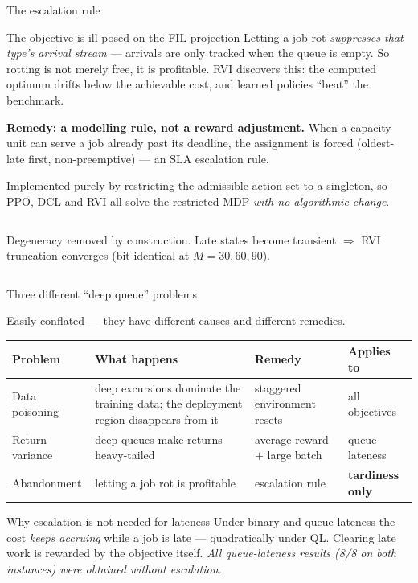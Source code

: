 \documentclass[11pt,aspectratio=169]{beamer}
\newcommand{\good}[1]{\textbf{#1}}
\begin{document}
\begin{frame}{The escalation rule}

\begin{alertblock}{The objective is ill-posed on the FIL projection}
Letting a job rot \emph{suppresses that type's arrival stream} --- arrivals are
only tracked when the queue is empty.  So rotting is not merely free, it is
profitable.  RVI discovers this: the computed optimum drifts below the
achievable cost, and learned policies ``beat'' the benchmark.
\end{alertblock}

\vfill
\textbf{Remedy: a modelling rule, not a reward adjustment.}  When a capacity
unit can serve a job already past its deadline, the assignment is forced
(oldest-late first, non-preemptive) --- an SLA escalation rule.

\vfill
Implemented purely by restricting the admissible action set to a singleton, so
PPO, DCL and RVI all solve the restricted MDP \emph{with no algorithmic change}.

\vfill
\begin{columns}[T]
Degeneracy removed by construction.
Late states become transient $\Rightarrow$ RVI truncation converges
(bit-identical at $M = 30, 60, 90$).
\end{columns}

\end{frame}

\begin{frame}{Three different ``deep queue'' problems}

Easily conflated --- they have different causes and different remedies.

\vfill
\begin{center}
\small
\begin{tabular}{p{3.2cm}p{4.6cm}p{3.0cm}p{2.6cm}}
\toprule
\textbf{Problem} & \textbf{What happens} & \textbf{Remedy} & \textbf{Applies to} \\
\midrule
Data poisoning & deep excursions dominate the training data; the deployment
region disappears from it & staggered environment resets & all objectives \\[3pt]
Return variance & deep queues make returns heavy-tailed & average-reward $+$
large batch & queue lateness \\[3pt]
Abandonment & letting a job rot is profitable & escalation rule & \good{tardiness only} \\
\bottomrule
\end{tabular}
\end{center}

\vfill
\begin{block}{Why escalation is not needed for lateness}
Under binary and queue lateness the cost \emph{keeps accruing} while a job is
late --- quadratically under QL.  Clearing late work is rewarded by the objective
itself.  \emph{All queue-lateness results (8/8 on both instances) were obtained
without escalation.}
\end{block}

\end{frame}
\end{document}
